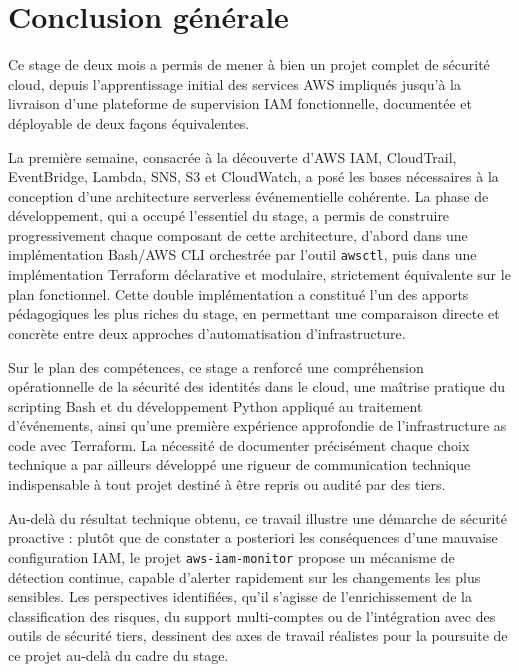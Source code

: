 \documentclass[11pt,a4paper]{report}
\begin{document}
\chapter*{Conclusion générale}

Ce stage de deux mois a permis de mener à bien un projet complet de sécurité cloud, depuis l'apprentissage initial des services AWS impliqués jusqu'à la livraison d'une plateforme de supervision IAM fonctionnelle, documentée et déployable de deux façons équivalentes.

La première semaine, consacrée à la découverte d'AWS IAM, CloudTrail, EventBridge, Lambda, SNS, S3 et CloudWatch, a posé les bases nécessaires à la conception d'une architecture serverless événementielle cohérente. La phase de développement, qui a occupé l'essentiel du stage, a permis de construire progressivement chaque composant de cette architecture, d'abord dans une implémentation Bash/AWS CLI orchestrée par l'outil \texttt{awsctl}, puis dans une implémentation Terraform déclarative et modulaire, strictement équivalente sur le plan fonctionnel. Cette double implémentation a constitué l'un des apports pédagogiques les plus riches du stage, en permettant une comparaison directe et concrète entre deux approches d'automatisation d'infrastructure.

Sur le plan des compétences, ce stage a renforcé une compréhension opérationnelle de la sécurité des identités dans le cloud, une maîtrise pratique du scripting Bash et du développement Python appliqué au traitement d'événements, ainsi qu'une première expérience approfondie de l'infrastructure as code avec Terraform. La nécessité de documenter précisément chaque choix technique a par ailleurs développé une rigueur de communication technique indispensable à tout projet destiné à être repris ou audité par des tiers.

Au-delà du résultat technique obtenu, ce travail illustre une démarche de sécurité proactive : plutôt que de constater a posteriori les conséquences d'une mauvaise configuration IAM, le projet \texttt{aws-iam-monitor} propose un mécanisme de détection continue, capable d'alerter rapidement sur les changements les plus sensibles. Les perspectives identifiées, qu'il s'agisse de l'enrichissement de la classification des risques, du support multi-comptes ou de l'intégration avec des outils de sécurité tiers, dessinent des axes de travail réalistes pour la poursuite de ce projet au-delà du cadre du stage.
\end{document}
